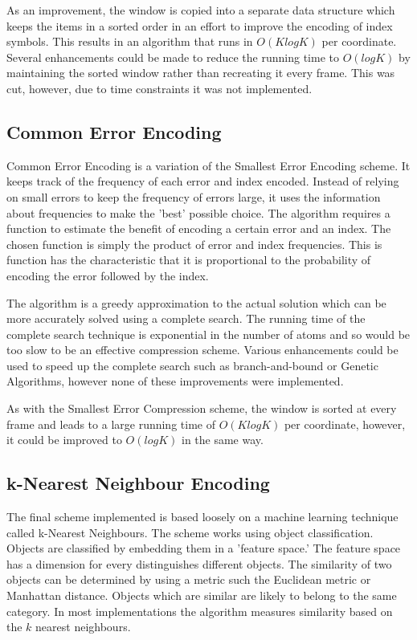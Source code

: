 \documentclass[a4paper,11pt]{report}
\begin{document}
As an improvement, the window is copied into a separate data structure which keeps the items in a sorted order in an effort to improve the encoding of index symbols. This results in an algorithm that runs in $O(KlogK)$ per coordinate. Several enhancements could be made to reduce the running time to $O(logK)$ by maintaining the sorted window rather than recreating it every frame. This was cut, however, due to time constraints it was not implemented.

\subsection{Common Error Encoding}

Common Error Encoding is a variation of the Smallest Error Encoding scheme. It keeps track of the frequency of each error and index encoded. Instead of relying on small errors to keep the frequency of errors large, it uses the information about frequencies to make the 'best' possible choice. The algorithm requires a function to estimate the benefit of encoding a certain error and an index. The chosen function is simply the product of error and index frequencies. This is function has the characteristic that it is proportional to the probability of encoding the error followed by the index.

The algorithm is a greedy approximation to the actual solution which can be more accurately solved using a complete search. The running time of the complete search technique is exponential in the number of atoms and so would be too slow to be an effective compression scheme. Various enhancements could be used to speed up the complete search such as branch-and-bound or Genetic Algorithms, however none of these improvements were implemented. 

As with the Smallest Error Compression scheme, the window is sorted at every frame and leads to a large running time of $O(KlogK)$ per coordinate, however, it could be improved to $O(logK)$ in the same way.

\subsection{k-Nearest Neighbour Encoding}

The final scheme implemented is based loosely on a machine learning technique called k-Nearest Neighbours. The scheme works using object classification. Objects are classified by embedding them in a 'feature space.' The feature space has a dimension for every distinguishes different objects. The similarity of two objects can be determined by using a metric such the Euclidean metric or Manhattan distance. Objects which are similar are likely to belong to the same category. In most implementations the algorithm measures similarity based on the $k$ nearest neighbours.
\end{document}
